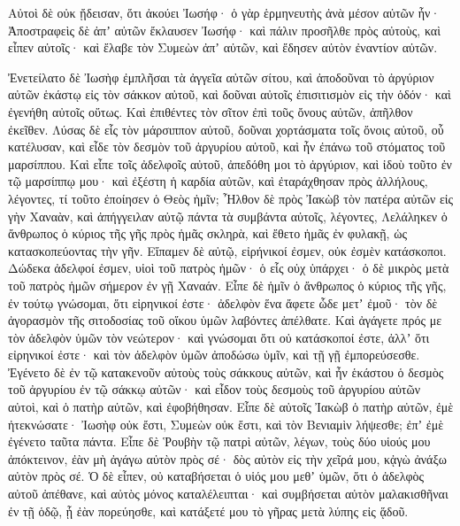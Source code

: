 {Αὐτοὶ δὲ οὐκ ᾔδεισαν, ὅτι ἀκούει Ἰωσήφ· ὁ γὰρ ἑρμηνευτὴς ἀνὰ μέσον αὐτῶν ἦν·
Ἀποστραφεὶς δὲ ἀπʼ αὐτῶν ἔκλαυσεν Ἰωσήφ· καὶ πάλιν προσῆλθε πρὸς αὐτοὺς, καὶ εἶπεν αὐτοῖς· καὶ ἔλαβε τὸν Συμεὼν ἀπʼ αὐτῶν, καὶ ἔδησεν αὐτὸν ἐναντίον αὐτῶν.
\par }{\PP {}Ἐνετείλατο δὲ Ἰωσὴφ ἐμπλῆσαι τὰ ἀγγεῖα αὐτῶν σίτου, καὶ ἀποδοῦναι τὸ ἀργύριον αὐτῶν ἑκάστῳ εἰς τὸν σάκκον αὐτοῦ, καὶ δοῦναι αὐτοῖς ἐπισιτισμὸν εἰς τὴν ὁδόν· καὶ ἐγενήθη αὐτοῖς οὕτως.
Καὶ ἐπιθέντες τὸν σῖτον ἐπὶ τοῦς ὄνους αὐτῶν, ἀπῆλθον ἐκεῖθεν.
Λύσας δὲ εἷς τὸν μάρσιππον αὐτοῦ, δοῦναι χορτάσματα τοῖς ὄνοις αὐτοῦ, οὗ κατέλυσαν, καὶ εἶδε τὸν δεσμὸν τοῦ ἀργυρίου αὐτοῦ, καὶ ἦν ἐπάνω τοῦ στόματος τοῦ μαρσίππου.
Καὶ εἶπε τοῖς ἀδελφοῖς αὐτοῦ, ἀπεδόθη μοι τὸ ἀργύριον, καὶ ἰδοὺ τοῦτο ἐν τῷ μαρσίππῳ μου· καὶ ἐξέστη ἡ καρδία αὐτῶν, καὶ ἐταράχθησαν πρὸς ἀλλήλους, λέγοντες, τί τοῦτο ἐποίησεν ὁ Θεὸς ἡμῖν;
Ἦλθον δὲ πρὸς Ἰακὼβ τὸν πατέρα αὐτῶν εἰς γὴν Χαναὰν, καὶ ἀπήγγειλαν αὐτῷ πάντα τὰ συμβάντα αὐτοῖς, λέγοντες,
Λελάληκεν ὁ ἄνθρωπος ὁ κύριος τῆς γῆς πρὸς ἡμᾶς σκληρὰ, καὶ ἔθετο ἡμᾶς ἐν φυλακῇ, ὡς κατασκοπεύοντας τὴν γῆν.
Εἴπαμεν δὲ αὐτῷ, εἰρήνικοί ἐσμεν, οὐκ ἐσμὲν κατάσκοποι.
Δώδεκα ἀδελφοί ἐσμεν, υἱοὶ τοῦ πατρὸς ἡμῶν· ὁ εἷς οὐχ ὑπάρχει· ὁ δὲ μικρὸς μετὰ τοῦ πατρὸς ἡμῶν σήμερον ἐν γῇ Χαναάν.
Εἶπε δὲ ἡμῖν ὁ ἄνθρωπος ὁ κύριος τῆς γῆς, ἐν τούτῳ γνώσομαι, ὅτι εἰρηνικοί ἐστε· ἀδελφὸν ἕνα ἄφετε ὧδε μετʼ ἐμοῦ· τὸν δὲ ἀγορασμὸν τῆς σιτοδοσίας τοῦ οἴκου ὑμῶν λαβόντες ἀπέλθατε.
Καὶ ἀγάγετε πρός με τὸν ἀδελφὸν ὑμῶν τὸν νεώτερον· καὶ γνώσομαι ὅτι οὐ κατάσκοποί ἐστε, ἀλλʼ ὅτι εἰρηνικοί ἐστε· καὶ τὸν ἀδελφὸν ὑμῶν ἀποδώσω ὑμῖν, καὶ τῇ γῇ ἐμπορεύσεσθε.
Ἐγένετο δὲ ἐν τῷ κατακενοῦν αὐτοὺς τοὺς σάκκους αὐτῶν, καὶ ἦν ἑκάστου ὁ δεσμὸς τοῦ ἀργυρίου ἐν τῷ σάκκῳ αὐτῶν· καὶ εἶδον τοὺς δεσμοὺς τοῦ ἀργυρίου αὐτῶν αὐτοὶ, καὶ ὁ πατὴρ αὐτῶν, καὶ ἐφοβήθησαν.
Εἶπε δὲ αὐτοῖς Ἰακὼβ ὁ πατὴρ αὐτῶν, ἐμὲ ἠτεκνώσατε· Ἰωσὴφ οὐκ ἔστι, Συμεὼν οὐκ ἔστι, καὶ τὸν Βενιαμὶν λήψεσθε; ἐπʼ ἐμὲ ἐγένετο ταῦτα πάντα.
Εἶπε δὲ Ῥουβὴν τῷ πατρὶ αὐτῶν, λέγων, τοὺς δύο υἱούς μου ἀπόκτεινον, ἐὰν μὴ ἀγάγω αὐτὸν πρὸς σέ· δὸς αὐτὸν εἰς τὴν χεῖρά μου, κᾀγὼ ἀνάξω αὐτὸν πρὸς σέ.
Ὁ δὲ εἶπεν, οὐ καταβήσεται ὁ υἱός μου μεθʼ ὑμῶν, ὅτι ὁ ἀδελφὸς αὐτοῦ ἀπέθανε, καὶ αὐτὸς μόνος καταλέλειπται· καὶ συμβήσεται αὐτὸν μαλακισθῆναι ἐν τῇ ὁδῷ, ᾗ ἐὰν πορεύησθε, καὶ κατάξετέ μου τὸ γῆρας μετὰ λύπης εἰς ᾅδοῦ.

}
